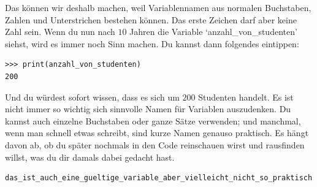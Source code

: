 Das können wir deshalb machen, weil Variablennamen aus normalen Buchstaben, Zahlen und Unterstrichen bestehen können. Das erste Zeichen darf aber keine Zahl sein. Wenn du nun nach $10$ Jahren die Variable `anzahl\_von\_studenten' siehst, wird es immer noch Sinn machen. Du kannst dann folgendes eintippen:

\begin{Verbatim}[frame=single]
>>> print(anzahl_von_studenten)
200
\end{Verbatim}

\noindent
Und du würdest sofort wissen, dass es sich um $200$ Studenten handelt. Es ist nicht immer so wichtig sich sinnvolle Namen für Variablen auszudenken. Du kannst auch einzelne Buchstaben oder ganze Sätze verwenden; und manchmal, wenn man schnell etwas schreibt, sind kurze Namen genauso praktisch. Es hängt davon ab, ob du später nochmals in den Code reinschauen wirst und rausfinden willst, was du dir damals dabei gedacht hast.

\begin{Verbatim}[frame=single]
das_ist_auch_eine_gueltige_variable_aber_vielleicht_nicht_so_praktisch
\end{Verbatim}

